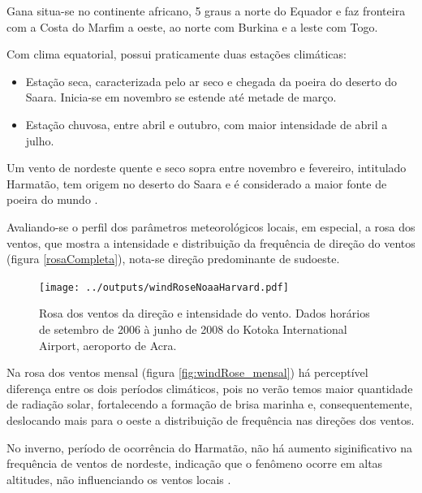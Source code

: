 Gana situa-se no continente africano, 5 graus a norte do Equador e 
faz fronteira com a Costa do Marfim a oeste, ao norte com Burkina
e a leste com Togo. 

Com clima equatorial, possui praticamente duas estações climáticas:

\begin{itemize}
  \item Estação seca, caracterizada pelo ar seco e chegada da poeira do deserto 
        do Saara. Inicia-se em novembro se estende até metade de março.
  \item Estação chuvosa, entre abril e outubro, com maior intensidade de abril a
        julho.
\end{itemize}

Um vento de nordeste quente e seco sopra entre novembro e fevereiro,
intitulado Harmatão, tem origem no deserto do Saara e é considerado 
a maior fonte de poeira do mundo \citep{breuning2005}.


Avaliando-se o perfil dos parâmetros meteorológicos locais, em especial, 
a rosa dos ventos, que mostra a intensidade e distribuição da frequência de 
direção do ventos (figura \ref{rosaCompleta}),
nota-se direção predominante de sudoeste. 

\begin{figure}[H]
  \centering
  \texttt{[image: ../outputs/windRoseNoaaHarvard.pdf]}
  \caption{Rosa dos ventos da direção e intensidade do vento. 
           Dados horários de setembro de 2006 à junho de 2008 do 
           Kotoka International Airport, aeroporto de Acra. 
           \label{fg:rosaCompleta}}
\end{figure}

Na rosa dos ventos mensal (figura \ref{fig:windRose_mensal})
há perceptível diferença entre os dois períodos climáticos, 
pois no verão temos maior quantidade de radiação solar, fortalecendo a 
formação de brisa marinha e, consequentemente, deslocando mais para o 
oeste a distribuição de frequência nas direções dos ventos.

No inverno, período de ocorrência do Harmatão, não há aumento siginificativo 
na frequência de ventos de nordeste, indicação que o fenômeno ocorre em 
altas altitudes, não influenciando os ventos locais \citep{breuning2005}. 

